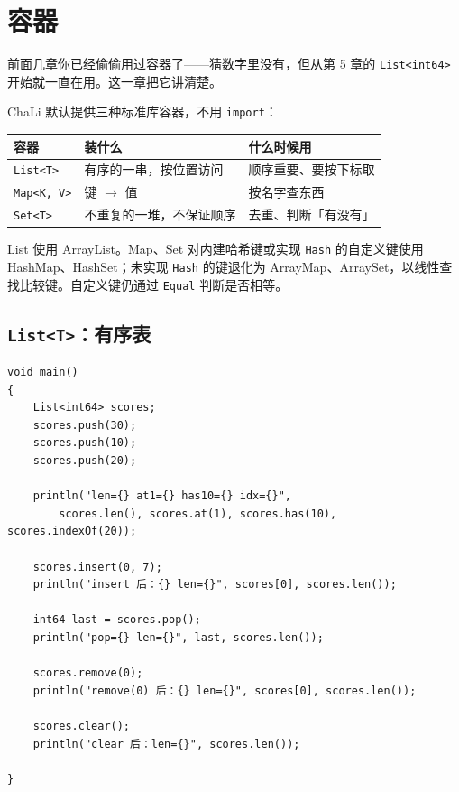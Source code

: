 \chapter{容器}
\label{ch:11}

前面几章你已经偷偷用过容器了——猜数字里没有，但从第 5 章的 \texttt{List<\allowbreak{}int64>\allowbreak{}} 开始就一直在用。这一章把它讲清楚。

ChaLi 默认提供三种标准库容器，不用 \texttt{import}：

\begin{center}
\begin{tabular}{lll}
\toprule
容器 & 装什么 & 什么时候用 \\
\midrule
\texttt{List<\allowbreak{}T>\allowbreak{}} & 有序的一串，按位置访问 & 顺序重要、要按下标取 \\
\texttt{Map<\allowbreak{}K,\allowbreak{} V>\allowbreak{}} & 键 \ensuremath{\rightarrow} 值 & 按名字查东西 \\
\texttt{Set<\allowbreak{}T>\allowbreak{}} & 不重复的一堆，不保证顺序 & 去重、判断「有没有」 \\
\bottomrule
\end{tabular}
\end{center}

List 使用 ArrayList。Map、Set 对内建哈希键或实现 \texttt{Hash} 的自定义键使用HashMap、HashSet；未实现 \texttt{Hash} 的键退化为 ArrayMap、ArraySet，以线性查找比较键。自定义键仍通过 \texttt{Equal} 判断是否相等。

\section{\texttt{List<\allowbreak{}T>\allowbreak{}}：有序表}

\par
\medskip
\begin{lstlisting}[style=chali]
void main()
{
    List<int64> scores;
    scores.push(30);
    scores.push(10);
    scores.push(20);

    println("len={} at1={} has10={} idx={}",
        scores.len(), scores.at(1), scores.has(10), scores.indexOf(20));

    scores.insert(0, 7);
    println("insert 后：{} len={}", scores[0], scores.len());

    int64 last = scores.pop();
    println("pop={} len={}", last, scores.len());

    scores.remove(0);
    println("remove(0) 后：{} len={}", scores[0], scores.len());

    scores.clear();
    println("clear 后：len={}", scores.len());

}
\end{lstlisting}
\par
\medskip

